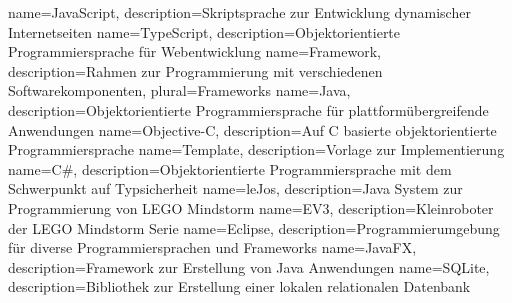 
{
	name=JavaScript,
	description={Skriptsprache zur Entwicklung dynamischer Internetseiten}
}
{
	name=TypeScript,
	description={Objektorientierte Programmiersprache für Webentwicklung}
}
{
	name=Framework,
	description={Rahmen zur Programmierung mit verschiedenen Softwarekomponenten},
	plural=Frameworks
}
{
	name=Java,
	description={Objektorientierte Programmiersprache für plattformübergreifende Anwendungen}
}
{
	name=Objective-C,
	description={Auf C basierte objektorientierte Programmiersprache}
}
{
	name=Template,
	description={Vorlage zur Implementierung}
}
{
	name=C\#,
	description={Objektorientierte Programmiersprache mit dem Schwerpunkt auf Typsicherheit}
}
{
	name=leJos,
	description={Java System zur Programmierung von LEGO Mindstorm}
}
{
	name=EV3,
	description={Kleinroboter der LEGO Mindstorm Serie}
}
{
	name=Eclipse,
	description={Programmierumgebung für diverse Programmiersprachen und Frameworks}
}
{
	name=JavaFX,
	description={Framework zur Erstellung von Java Anwendungen}
}
{
	name=SQLite,
	description={Bibliothek zur Erstellung einer lokalen relationalen Datenbank}
}


